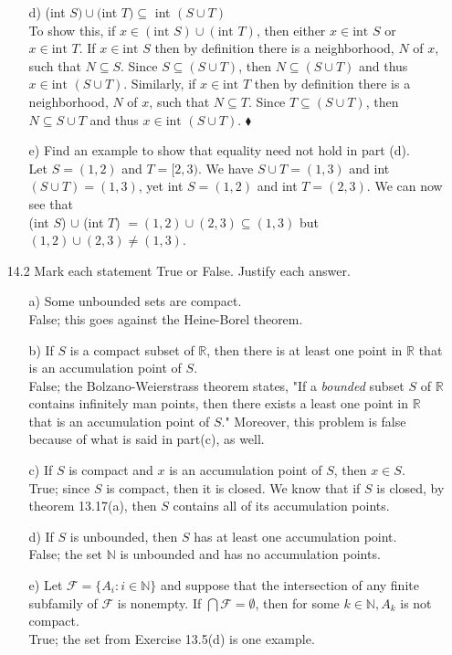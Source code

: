 \documentclass[12pt]{article}
\begin{document}
\begin{enumerate}
\begin{enumerate}
\item[d)] (int $S) \cup ($int $T) \subseteq$ int $(S \cup T)$ \\
To show this, if $x \in (\mbox{int }S) \cup (\mbox{int } T)$, then either 
$x \in \mbox{int } S$ or $x \in \mbox{int }T$. If $x \in \mbox{int } S$ then by definition
there is a neighborhood, $N$ of $x$, such that $N \subseteq S$. Since $S \subseteq (S \cup T)$, then $N \subseteq (S \cup T)$ and thus $x \in \mbox{int } (S \cup T)$. Similarly, if $x \in \mbox{int } T$ then by definition there is a neighborhood, $N$ of $x$, such that $N \subseteq T$. 
Since $T \subseteq (S \cup T)$, then $N \subseteq S \cup T$ and thus $x \in \mbox{int }(S \cup T)$.
$\blacklozenge$
\item[e)] Find an example to show that equality need not hold in part (d). \\
Let $S = (1, 2)$ and $T = [2, 3)$. We have $S \cup T = (1, 3)$ and int $(S \cup T) = (1, 3)$, 
yet int $S = (1, 2)$ and int $T = (2, 3)$. We can now see that \\
(int $S$) $\cup$ (int $T$) $= (1, 2)\cup (2, 3) \subseteq (1, 3)$ but $(1, 2)\cup (2, 3) \neq (1, 3)$.
\end{enumerate}

\item[14.2] Mark each statement True or False. Justify each answer.
\begin{enumerate}
\item[a)] Some unbounded sets are compact.\\
False; this goes against the Heine-Borel theorem.
\item[b)] If $S$ is a compact subset of $\mathbb{R}$, then there is at least one point in $\mathbb{R}$ that is an accumulation point of $S$. \\
False; the Bolzano-Weierstrass theorem states, "If a \emph{bounded} subset $S$ of
$\mathbb{R}$ contains infinitely man points, then there exists a least one point in
$\mathbb{R}$ that is an accumulation point of $S$." Moreover, this problem is false because
of what is said in part(c), as well. 
\item[c)] If $S$ is compact and $x$ is an accumulation point of $S$, then $x \in S$. \\
True; since $S$ is compact, then it is closed. We know that if $S$ is closed, by 
theorem 13.17(a), then $S$ contains all of its accumulation points. 
\item[d)] If $S$ is unbounded, then $S$ has at least one accumulation point. \\
False; the set $\mathbb{N}$ is unbounded and has no accumulation points.
\item[e)] Let $\mathcal{F} = \{ A_i : i \in \mathbb{N} \}$ and suppose that the intersection of any finite subfamily of $\mathcal{F}$ is nonempty. If $\bigcap \mathcal{F} = \emptyset$, then for some $k \in \mathbb{N}, A_k$ is not compact. \\
True; the set from Exercise 13.5(d) is one example.
\end{enumerate}


\end{enumerate}
\end{document}
